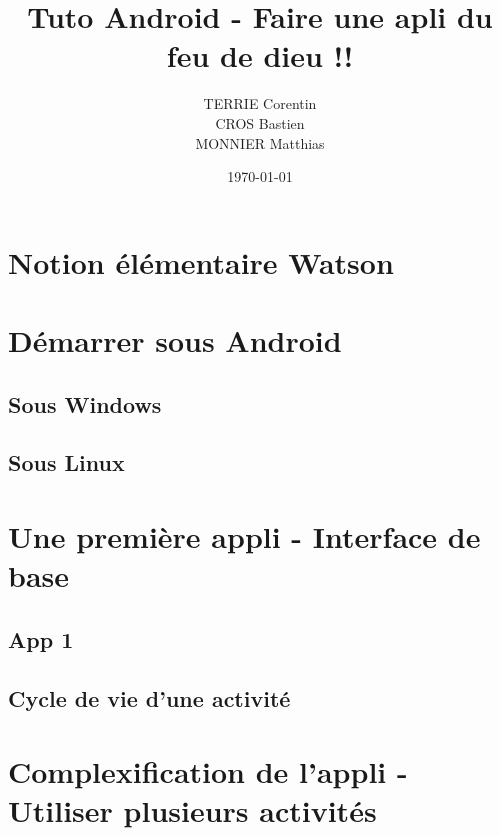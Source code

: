 \documentclass[a4paper,10pt]{article}
\title{Tuto Android - Faire une apli du feu de dieu !!}
\author{TERRIE Corentin \\ CROS Bastien \\ MONNIER Matthias}
\date{\today}
\begin{document}

\tableofcontents
\clearpage




\section{Notion élémentaire Watson} %



\section{Démarrer sous Android}

\subsection{Sous Windows}

\subsection{Sous Linux}


\section{Une première appli - Interface de base}

\subsection{App 1}
\subsection{Cycle de vie d'une activité}


\section{Complexification de l'appli - Utiliser plusieurs activités}
\end{document}
